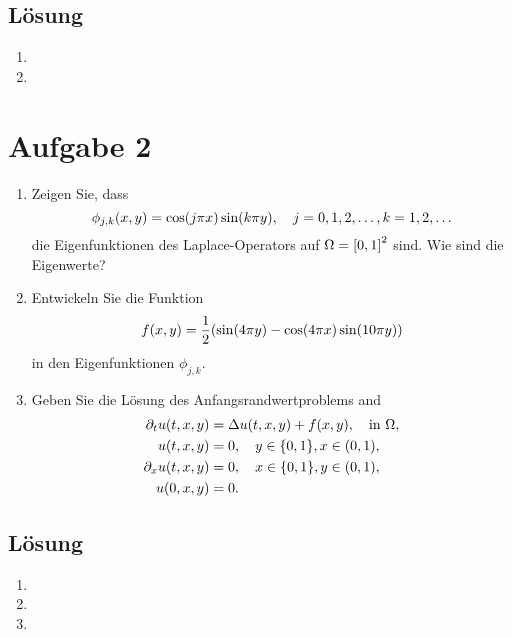 \documentclass{exercise}
\begin{document}
    \subsection*{Lösung}
    \begin{enumerate}
        \item
        \item
    \end{enumerate}


    \section*{Aufgabe 2}
    
    \begin{problem}
        \begin{enumerate}
            \item Zeigen Sie, dass
            \[
                \phi_{j, k}\parentheses*{x, y} = \cos\parentheses*{j\pi x}\sin\parentheses*{k\pi y}, \quad j = 0, 1, 2, \ldots, k = 1, 2, \ldots
            \]
            die Eigenfunktionen des Laplace-Operators auf \(\Omega = \brackets*{0, 1}^2\) sind.
            Wie sind die Eigenwerte?
            \item Entwickeln Sie die Funktion
            \[
                f\parentheses*{x, y} = \frac{1}{2}\parentheses*{\sin\parentheses*{4\pi y} - \cos\parentheses*{4\pi x}\sin\parentheses*{10\pi y}}
            \]
            in den Eigenfunktionen \(\phi_{j, k}\).
            \item Geben Sie die Lösung des Anfangsrandwertproblems and
            \begin{align*}
                \partial_t u\parentheses*{t, x, y} &= \Delta u\parentheses*{t, x, y} + f\parentheses*{x, y}, \quad \text{in }\Omega,\\
                u\parentheses*{t, x, y} &= 0, \quad y \in \braces*{0, 1}, x \in \parentheses*{0, 1},\\
                \partial_x u\parentheses*{t, x, y} &= 0, \quad x \in \braces*{0, 1}, y \in \parentheses*{0, 1},\\
                u\parentheses*{0, x, y} &= 0.
            \end{align*}
        \end{enumerate}
    \end{problem}
    
    \subsection*{Lösung}
    \begin{enumerate}
        \item
        \item
        \item
    \end{enumerate}
\end{document}
